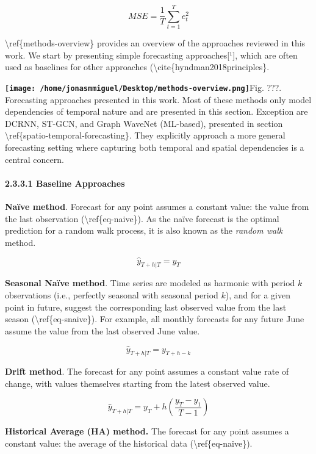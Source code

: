 \documentclass[
]{article}
\begin{document}
\[MSE = \frac{1}{T}\sum_{t=1}^T e^2_t\]

\textbackslash ref\{methods-overview\} provides an overview of the
approaches reviewed in this work. We start by presenting simple
forecasting approaches{[}¹{]}, which are often used as baselines for
other approaches (\textbackslash cite\{hyndman2018principles\}.

\textbf{\texttt{[image: /home/jonasmmiguel/Desktop/methods-overview.png]}}Fig.
???. Forecasting approaches presented in this work. Most of these
methods only model dependencies of temporal nature and are presented in
this section. Exception are DCRNN, ST-GCN, and Graph WaveNet (ML-based),
presented in section \textbackslash ref\{spatio-temporal-forecasting\}.
They explicitly approach a more general forecasting setting where
capturing both temporal and spatial dependencies is a central concern.

\hypertarget{header-n113}{%
\paragraph{2.3.3.1 Baseline Approaches}\label{header-n113}}

\textbf{Naïve method}. Forecast for any point assumes a constant value:
the value from the last observation (\textbackslash ref\{eq-naive\}). As
the naïve forecast is the optimal prediction for a random walk process,
it is also known as the \emph{random walk} method.

\[\hat{y}_{T+h|T} = y_T\]

\textbf{Seasonal Naïve method}. Time series are modeled as harmonic with
period \(k\) observations (i.e., perfectly seasonal with seasonal period
\(k\)), and for a given point in future, suggest the corresponding last
observed value from the last season (\textbackslash ref\{eq-snaive\}).
For example, all monthly forecasts for any future June assume the value
from the last observed June value.

\[\hat{y}_{T+h|T} = y_{T+h-k}\]

\textbf{Drift method}. The forecast for any point assumes a constant
value rate of change, with values themselves starting from the latest
observed value.

\[\hat{y}_{T+h|T} = y_{T} + h\left(\frac{y_T-y_1}{T-1} \right)\]

\textbf{Historical Average (HA) method. } The forecast for any point
assumes a constant value: the average of the historical data
(\textbackslash ref\{eq-naive\}).
\end{document}
